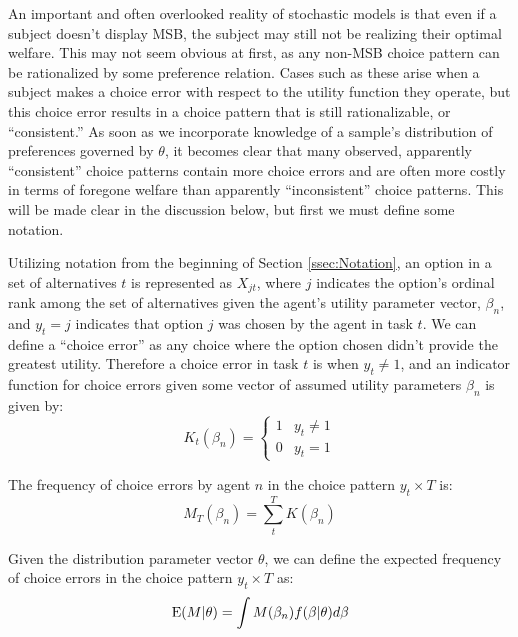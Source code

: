 \documentclass[../main.tex]{subfiles}
\begin{document}
An important and often overlooked reality of stochastic models is that even if a subject doesn't display MSB, the subject may still not be realizing their optimal welfare.
This may not seem obvious at first, as any non-MSB choice pattern can be rationalized by some preference relation.
Cases such as these arise when a subject makes a choice error with respect to the utility function they operate, but this choice error results in a choice pattern that is still rationalizable, or \enquote{consistent.}
As soon as we incorporate knowledge of a sample's distribution of preferences governed by $\theta$, it becomes clear that many observed, apparently \enquote{consistent} choice patterns contain more choice errors and are often more costly in terms of foregone welfare than apparently \enquote{inconsistent} choice patterns.
This will be made clear in the discussion below, but first we must define some notation.

Utilizing notation from the beginning of Section \ref{ssec:Notation}, an option in a set of alternatives $t$ is represented as $X_{jt}$, where $j$ indicates the option's ordinal rank among the set of alternatives given the agent's utility parameter vector, $\beta_n$, and $y_t = j$ indicates that option $j$ was chosen by the agent in task $t$.
We can define a \enquote{choice error} as any choice where the option chosen didn't provide the greatest utility.
Therefore a choice error in task $t$ is when $y_t \neq 1$, and an indicator function for choice errors given some vector of assumed utility parameters $\beta_n$ is given by:
\begin{equation}
	\label{eq3:Itb}
	K_{t}(\beta_n) = 
	\begin{cases}
		 1 & y_t \neq 1\\
		 0 & y_t = 1
	\end{cases}
\end{equation}

\noindent The frequency of choice errors by agent $n$ in the choice pattern $y_t \times T$ is:
\begin{equation}
	\label{eq3:MTBn}
	M_T(\beta_n) = \sum_t^T K(\beta_n)
\end{equation}

Given the distribution parameter vector $\theta$, we can define the expected frequency of choice errors in the choice pattern $y_t \times T$ as:
\begin{equation}
	\label{eq3:EMt}
	\operatorname{E}(M | \theta) = \int M(\beta_n) f(\beta | \theta) d\beta
\end{equation}
\end{document}
